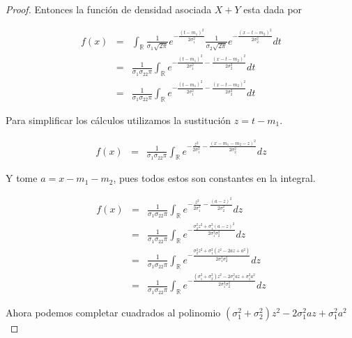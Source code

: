 \documentclass[paper=letter, fontsize=11pt]{scrartcl} %
\numberwithin{equation}{section} %
\numberwithin{figure}{section} %
\numberwithin{table}{section} %
\begin{document}
\begin{enumerate}[label = \Alph*)]
\begin{enumerate}[label = \arabic*)]
\begin{proof}
	Entonces la función de densidad asociada $ X+Y $ esta dada por
	
	\begin{eqnarray}
	f(x) &=& \int_{\mathbb{R}} \frac{1}{\sigma_1\sqrt{2\pi}}e^{-\frac{(t-m_1)^2}{2\sigma_1^2}}\frac{1}{\sigma_2\sqrt{2\pi}}e^{-\frac{(x-t-m_2)^2}{2\sigma_2^2}}dt \nonumber
	\\&=&  \frac{1}{\sigma_1\sigma_22\pi}\int_{\mathbb{R}}e^{-\frac{(t-m_1)^2}{2\sigma_1^2}-\frac{(x-t-m_2)^2}{2\sigma_2^2}} \nonumber dt
	\\&=&  \frac{1}{\sigma_1\sigma_22\pi}\int_{\mathbb{R}}e^{-\frac{(t-m_1)^2}{2\sigma_1^2}-\frac{(x-t-m_2)^2}{2\sigma_2^2}} \nonumber dt
	\end{eqnarray}
	
	Para simplificar los cálculos utilizamos la sustitución $ z = t-m_1 $.
	
	\begin{eqnarray}
	f(x) &=&
	\frac{1}{\sigma_1\sigma_22\pi}\int_{\mathbb{R}}e^{-\frac{z^2}{2\sigma_1^2}-\frac{(x-m_1-m_2-z)^2}{2\sigma_2^2}} \nonumber dz
	\end{eqnarray}
	
	Y tome $ a = x-m_1-m_2 $, pues todos estos son constantes en la integral.
	
	\begin{eqnarray}
	f(x) &=& 	\frac{1}{\sigma_1\sigma_22\pi}\int_{\mathbb{R}}e^{-\frac{z^2}{2\sigma_1^2}-\frac{(a-z)^2}{2\sigma_2^2}} \nonumber dz
	\\&=& \frac{1}{\sigma_1\sigma_22\pi}\int_{\mathbb{R}}e^{-\frac{\sigma_2^2z^2+\sigma_1^2(a-z)^2}{2\sigma_1^2\sigma_2^2}} \nonumber dz
	\\&=& \frac{1}{\sigma_1\sigma_22\pi}\int_{\mathbb{R}}e^{-\frac{\sigma_2^2z^2+\sigma_1^2(z^2-2az+a^2)}{2\sigma_1^2\sigma_2^2}} \nonumber dz
	\\&=& \frac{1}{\sigma_1\sigma_22\pi}\int_{\mathbb{R}}e^{-\frac{(\sigma_1^2+\sigma_2^2)z^2-2\sigma_1^2az+\sigma_1^2a^2}{2\sigma_1^2\sigma_2^2}} \nonumber dz
	\end{eqnarray}
	
	Ahora podemos completar cuadrados al polinomio $ (\sigma_1^2+\sigma_2^2)z^2-2\sigma_1^2az+\sigma_1^2a^2 $
	

\end{proof}
\end{enumerate}
\end{enumerate}
\end{document}
